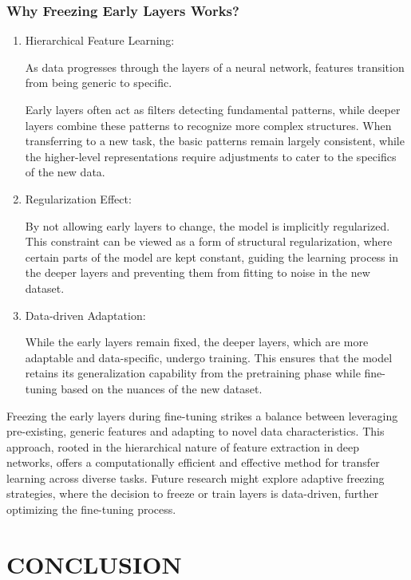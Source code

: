 \documentclass{article}
\begin{document}
\subsubsection{Why Freezing Early Layers Works?}
\begin{enumerate}
  \item Hierarchical Feature Learning: 
  
  As data progresses through the layers of a neural network, features transition from being generic to specific. 

Early layers often act as filters detecting fundamental patterns, while deeper layers combine these patterns to recognize more complex structures. 
When transferring to a new task, the basic patterns remain largely consistent, while the higher-level representations require adjustments to cater to the specifics of the new data.

\item Regularization Effect: 

By not allowing early layers to change, the model is implicitly regularized. This constraint can be viewed as a form of structural regularization, where certain parts of the model are kept constant, guiding the learning process in the deeper layers and preventing them from fitting to noise in the new dataset.

\item Data-driven Adaptation: 

While the early layers remain fixed, the deeper layers, which are more adaptable and data-specific, undergo training. This ensures that the model retains its generalization capability from the pretraining phase while fine-tuning based on the nuances of the new dataset.
\end{enumerate}

Freezing the early layers during fine-tuning strikes a balance between leveraging pre-existing, generic features and adapting to novel data characteristics. This approach, rooted in the hierarchical nature of feature extraction in deep networks, offers a computationally efficient and effective method for transfer learning across diverse tasks. Future research might explore adaptive freezing strategies, where the decision to freeze or train layers is data-driven, further optimizing the fine-tuning process.
  
\section{CONCLUSION}
\label{sec:conclusion}
\end{document}
